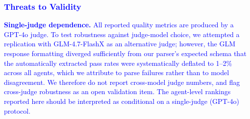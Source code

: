 \subsubsection{\textcolor{blue}{Threats to Validity}}
\label{sec:threats}
\textcolor{blue}{\textbf{Single-judge dependence.} All reported quality metrics are produced by a GPT-4o judge. To test robustness against judge-model choice, we attempted a replication with GLM-4.7-FlashX as an alternative judge; however, the GLM response formatting diverged sufficiently from our parser's expected schema that the automatically extracted pass rates were systematically deflated to 1--2\% across all agents, which we attribute to parse failures rather than to model disagreement. We therefore do not report cross-model judge numbers, and flag cross-judge robustness as an open validation item. The agent-level rankings reported here should be interpreted as conditional on a single-judge (GPT-4o) protocol.}

